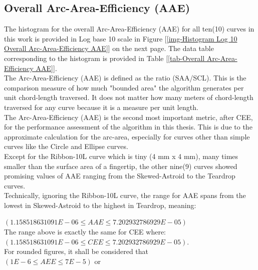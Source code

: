 \clearpage
\pagebreak

\subsection{Overall Arc-Area-Efficiency (AAE)}
\label{chap4-Overall Arc-Area-Efficiency AAE}

The histogram for the overall Arc-Area-Efficiency (AAE) for all ten(10) curves in this work is provided in Log base 10 scale in Figure [\ref{img-Histogram Log 10 Overall Arc-Area-Efficiency AAE}] on the next page. The data table corresponding to the histogram is provided in Table [\ref{tab-Overall Arc-Area-Efficiency AAE}]. \\

The Arc-Area-Efficiency (AAE)  is defined as the ratio (SAA/SCL). This is the comparison measure of how much "bounded area" the algorithm generates per unit chord-length traversed. It does not matter how many meters of chord-length traversed for any curve because it is a measure per unit length. \\

The Arc-Area-Efficiency (AAE) is the second most important metric, after CEE, for the performance assessment of the algorithm in this thesis. This is due to the approximate calculation for the arc-area, especially for curves other than  simple curves like the Circle and Ellipse curves.\\

Except for the Ribbon-10L curve which is tiny (4 mm x 4 mm), many times smaller than the surface area of a fingertip, the other nine(9) curves showed promising values of AAE ranging from the Skewed-Astroid to the Teardrop curves. \\

Technically, ignoring the Ribbon-10L curve, the range for AAE spans from the lowest in Skewed-Astroid to the highest in Teardrop, meaning:

\noindent
$(1.158518631091E-06 \le AAE \le 7.202932786929E-05)$ \\ 

\noindent 
The range above is exactly the same for CEE where:\\
$(1.158518631091E-06 \le CEE \le 7.202932786929E-05)$. \\

\noindent
For rounded figures, it shall be considered that \\
\noindent
$(1E-6 \le AEE \le 7E-5)$  or \\

